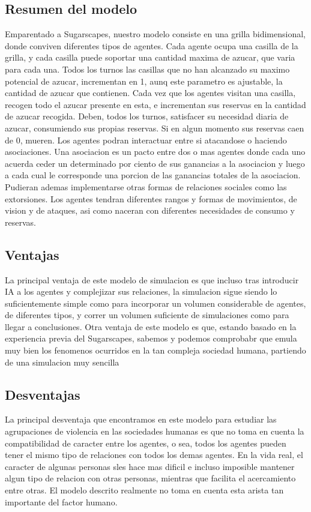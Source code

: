 \documentclass[11pt]{article}
\begin{document}
\subsection{Resumen del modelo}
Emparentado a Sugarscapes, nuestro modelo consiste en una grilla bidimensional, donde conviven diferentes tipos de agentes. Cada agente ocupa una casilla de la grilla, y cada casilla puede soportar una cantidad maxima de azucar, que varia para cada una. Todos los turnos las casillas que no han alcanzado su maximo potencial de azucar, incrementan en 1, aunq este parametro es ajustable, la cantidad de azucar que contienen. Cada vez que los agentes visitan una casilla, recogen todo el azucar presente en esta, e incrementan sus reservas en la cantidad de azucar recogida. Deben, todos los turnos, satisfacer su necesidad diaria de azucar, consumiendo sus propias reservas. Si en algun momento sus reservas caen de 0, mueren.
Los agentes podran interactuar entre si atacandose o haciendo asociaciones. Una asociacion es un pacto entre dos o mas agentes donde cada uno acuerda ceder un determinado por ciento de sus ganancias a la asociacion y luego a cada cual le corresponde una porcion de las ganancias totales de la asociacion. Pudieran ademas implementarse otras formas de relaciones sociales como las extorsiones.
Los agentes tendran diferentes rangos y formas de movimientos, de vision y de ataques, asi como naceran con diferentes necesidades de consumo y reservas.
\subsection{Ventajas}
La principal ventaja de este modelo de simulacion es que incluso tras introducir IA a los agentes y complejizar sus relaciones, la simulacion sigue siendo lo suficientemente simple como para incorporar un volumen considerable de agentes, de diferentes tipos, y correr un volumen suficiente de simulaciones como para llegar a conclusiones. Otra ventaja de este modelo es que, estando basado en la experiencia previa del Sugarscapes, sabemos y podemos comprobabr que emula muy bien los fenomenos ocurridos en la tan compleja sociedad humana, partiendo de una simulacion muy sencilla
\subsection{Desventajas}
La principal desventaja que encontramos en este modelo para estudiar las agrupaciones de violencia en las sociedades humanas es que no toma en cuenta la compatibilidad de caracter entre los agentes, o sea, todos los agentes pueden tener el mismo tipo de relaciones con todos los demas agentes. En la vida real, el caracter de algunas personas sles hace mas dificil e incluso imposible mantener algun tipo de relacion con otras personas, mientras que facilita el acercamiento entre otras. El modelo descrito realmente no toma en cuenta esta arista tan importante del factor humano.
\end{document}
